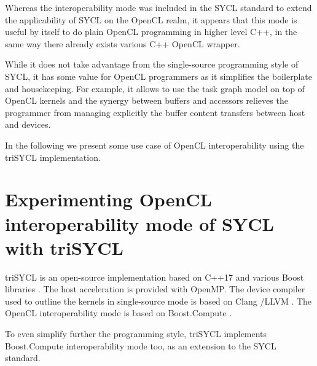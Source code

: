 \documentclass[sigplan, review, authordraft]{acmart}
\begin{document}
Whereas the interoperability mode was included in the SYCL standard to
extend the applicability of SYCL on the OpenCL realm, it appears that
this mode is useful by itself to do plain OpenCL programming in higher
level C++, in the same way there already exists various C++ OpenCL
wrapper.

While it does not take advantage from the single-source programming
style of SYCL, it has some value for OpenCL programmers as it
simplifies the boilerplate and housekeeping. For example, it allows to
use the task graph model on top of OpenCL kernels and the synergy
between buffers and accessors relieves the programmer from managing
explicitly the buffer content transfers between host and devices.

In the following we present some use case of OpenCL interoperability
using the triSYCL implementation.


\section{Experimenting OpenCL interoperability mode of SYCL with
  triSYCL}
\label{sec:exper-with-opencl}

triSYCL \cite{triSYCL} is an open-source implementation based on C++17
and various Boost libraries \cite{Boost-1.63}. The host acceleration
is provided with OpenMP. The device compiler used to outline the
kernels in single-source mode is based on Clang \cite{Clang-4.0}/LLVM
\cite{LLVM-4.0}. The OpenCL interoperability mode is based on
Boost.Compute \cite{Boost.Compute}.

To even simplify further the programming style, triSYCL
implements Boost.Compute interoperability mode too, as an extension to
the SYCL standard.
\end{document}
